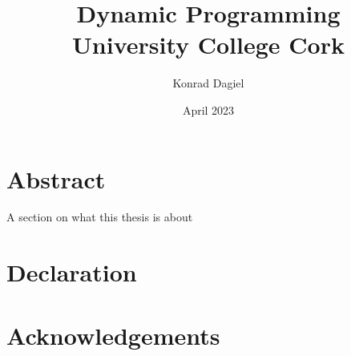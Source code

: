 \documentclass{report}
\title{\textbf{Dynamic Programming} \\
\Large{University College Cork}}
\author{Konrad Dagiel}
\date{April 2023}
\begin{document}
\maketitle

\chapter*{Abstract}
A section on what this thesis is about

\chapter*{Declaration}

\chapter*{Acknowledgements}

\tableofcontents


\end{document}
